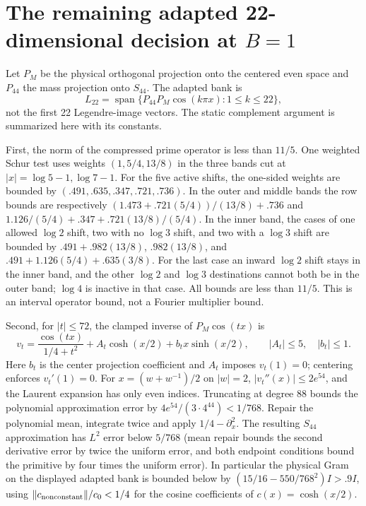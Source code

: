 \documentclass[11pt]{article}
\begin{document}
\section[Adapted 22-dimensional decision at B=1]{The remaining adapted 22-dimensional decision at $B=1$}
Let $P_M$ be the physical orthogonal projection onto the centered even space and $P_{44}$ the mass projection onto $S_{44}$. The adapted bank is
\[
 L_{22}=\operatorname{span}\{P_{44}P_M\cos(k\pi x):1\le k\le22\},
\]
not the first 22 Legendre-image vectors. The static complement argument is summarized here with its constants.

First, the norm of the compressed prime operator is less than $11/5$. One weighted Schur test uses weights $(1,5/4,13/8)$ in the three bands cut at $|x|=\log5-1,\log7-1$. For the five active shifts, the one-sided weights are bounded by $(.491,.635,.347,.721,.736)$. In the outer and middle bands the row bounds are respectively $(1.473+.721(5/4))/(13/8)+.736$ and $1.126/(5/4)+.347+.721(13/8)/(5/4)$. In the inner band, the cases of one allowed $\log 2$ shift, two with no $\log3$ shift, and two with a $\log3$ shift are bounded by $.491+.982(13/8)$, $.982(13/8)$, and $.491+1.126(5/4)+.635(3/8)$. For the last case an inward $\log2$ shift stays in the inner band, and the other $\log2$ and $\log3$ destinations cannot both be in the outer band; $\log4$ is inactive in that case. All bounds are less than $11/5$. This is an interval operator bound, not a Fourier multiplier bound.

Second, for $|t|\le72$, the clamped inverse of $P_M\cos(tx)$ is
\[
 v_t=\frac{\cos(tx)}{1/4+t^2}+A_t\cosh(x/2)+b_t x\sinh(x/2),
 \qquad |A_t|\le5,\quad |b_t|\le1.
\]
Here $b_t$ is the center projection coefficient and $A_t$ imposes $v_t(1)=0$; centering enforces $v_t'(1)=0$. For $x=(w+w^{-1})/2$ on $|w|=2$, $|v_t''(x)|\le2e^{54}$, and the Laurent expansion has only even indices. Truncating at degree 88 bounds the polynomial approximation error by $4e^{54}/(3\cdot4^{44})<1/768$. Repair the polynomial mean, integrate twice and apply $1/4-\partial_x^2$. The resulting $S_{44}$ approximation has $L^2$ error below $5/768$ (mean repair bounds the second derivative error by twice the uniform error, and both endpoint conditions bound the primitive by four times the uniform error). In particular the physical Gram on the displayed adapted bank is bounded below by $(15/16-550/768^2)I>.9I$, using $\|c_{\rm nonconstant}\|/c_0<1/4$ for the cosine coefficients of $c(x)=\cosh(x/2)$.
\end{document}
